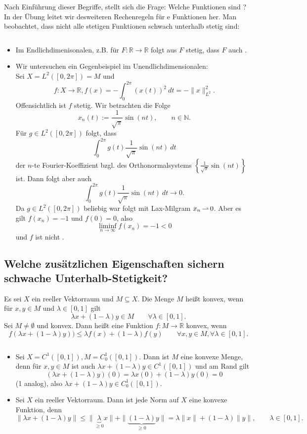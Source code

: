 \documentclass[main.tex]{subfiles}
\begin{document}
\setcounter{chapter}{2}
\setcounter{satz}{5}
Nach Einführung dieser Begriffe, stellt sich die Frage: Welche Funktionen sind \suhs{}?
In der Übung leitet wir desweiteren Rechenregeln für \suhs{}e Funktionen her.
Man beobachtet, dass nicht alle stetigen Funktionen schwach unterhalb stetig sind:

\begin{bsp}\label{2.6}$ $\\[-1em]
\begin{itemize}
\item Im Endlichdimenisonalen, z.B. für $F\colon ℝ\to ℝ$ folgt aus $F$ stetig, dass $F$ auch \suhs{}.
\item Wir untersuchen ein Gegenbeispiel im Unendlichdimensionalen:\\
Sei $X = L^2([0,2π]) = M$ und 
$$f\colon X\to ℝ, f(x) = -\int_0^{2π} \left(x(t)\right)^2~dt = -\| x\|_{L^2}^2.$$
Offensichtlich ist $f$ stetig.
Wir betrachten die Folge
$$x_n(t) := \frac{1}{\sqrt{π}} \sin (nt), \qquad n\in ℕ.$$
Für $g\in L^2([0,2π])$ folgt, dass
$$\int_0^{2π} g(t) \frac{1}{\sqrt{π}}\sin(nt)~dt$$
der $n$-te Fourier-Koeffizient bzgl. des Orthonormalsystems $\left\{ \frac{1}{\sqrt{π}}\sin(nt)\right\}$ ist. Dann folgt aber auch
$$\int_0^{2π} g(t) \frac{1}{\sqrt{π}} \sin (nt)~dt \to 0.$$
Da $g\in L^2([0,2π])$ beliebig war folgt mit Lax-Milgram $x_n \operatorname{\rightharpoonup} 0$.
Aber es gilt $f(x_n) = -1$ und $f(0) = 0$, also
$$\liminf_{n\to ∞} f(x_n) = -1 < 0$$
und $f$ ist nicht \suhs{}.  
\end{itemize}
\end{bsp}

\subsection*{Welche zusätzlichen Eigenschaften sichern schwache Unterhalb-Stetigkeit?}

\begin{mydef}\label{2.7}
Es sei $X$ ein reeller Vektorraum und $M\subseteq X$.
Die Menge $M$ heißt konvex, wenn für $x,y\in M$ und $λ\in [0,1]$ gilt
$$λx + (1-λ) y \in M\qquad ∀λ\in [0,1].$$
Sei $M\ne ∅$ und konvex. Dann heißt eine Funktion $f\colon M\to ℝ$ konvex, wenn
$$f(λx + (1-λ)y)) \le λf(x) + (1-λ) f(y) \qquad ∀ x,y\in M, ∀λ\in [0,1].$$
\end{mydef}

\begin{bsp}\label{2.8}$ $\\[-1em]
\begin{itemize}
\item Sei $X = C^1([0,1]), M = C_0^1([0,1])$. Dann ist $M$ eine konvexe Menge, denn für $x,y \in M$ ist auch $λx + (1-λ)y \in C^1([0,1])$ und am Rand gilt
$$\left( λx + (1-λ) y \right)(0) = λx(0) + (1-λ) y(0) = 0$$
(1 analog), also $λx + (1-λ) y \in C_0^1 \left( [0,1] \right).$
\item Sei $X$ ein reeller Vektorraum. Dann ist jede Norm auf $X$ eine konvexe Funktion,
denn 
$$\| λx + (1-λ) y \| \le \| \underbrace{λ}_{\ge 0} x \| + \| \underbrace{(1-λ)}_{\ge 0} y \| = λ\| x\| + (1-λ) \| y\|, \qquad λ\in [0,1].$$ 
\end{itemize}
\end{bsp}
\end{document}
